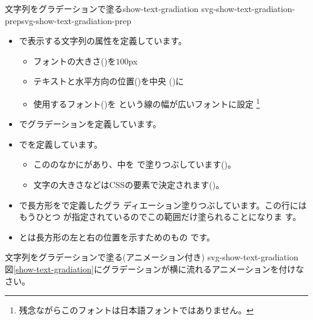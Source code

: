     {文字列をグラデーションで塗る}{show-text-gradiation}
{svg-show-text-gradiation-prep}{svg-show-text-gradiation-prep}
\begin{itemize}
 \item {}で表示する文字列の属性を定義しています。
\begin{itemize}
 \item フォントの大きさ()を$100$px
 \item テキストと水平方向の位置()を中央
       ()に
 \item 使用するフォント()を
       という線の幅が広いフォントに設定
\footnote{残念ながらこのフォントは日本語フォントではありません。}
\end{itemize}
 \item {}でグラデーションを定義しています。
 \item {}でを定義しています。
\begin{itemize}
 \item こののなかにがあり、中を
       で塗りつぶしています()。
 \item 文字の大きさなどはCSSの要素で決定されます()。
\end{itemize}
 \item {}で長方形をで定義したグラ
       ディエーション塗りつぶしています。この行にはもうひとつ
       が指定されているのでこの範囲だけ塗られることになりま
       す。
 \item {}とは長方形の左と右の位置を示すためのもの
       です。
\end{itemize}
{文字列をグラデーションで塗る(アニメーション付き)}
{svg-show-text-gradiation}
{図\ref{show-text-gradiation}にグラデーションが横に流れるアニメーションを付けなさい。}

